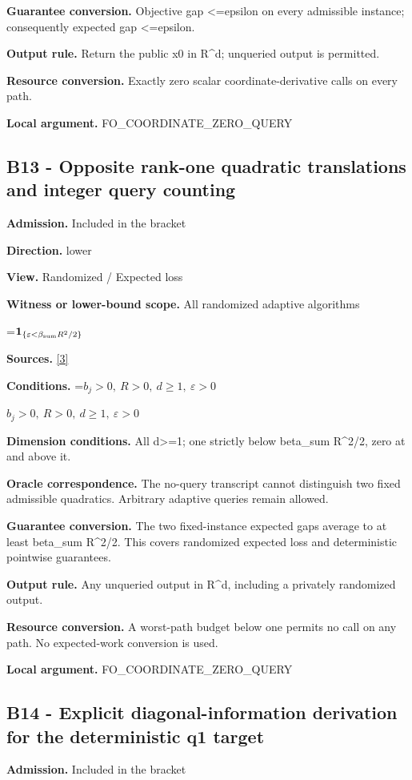 \documentclass[10pt,a4paper]{article}
\newcommand{\AtlasMath}[1]{\par\begingroup\centering\setbox0=\hbox{$\displaystyle #1$}\ifdim\wd0>1.4\linewidth\typeout{ATLAS WIDE FORMULA: \the\wd0}\fi\ifdim\wd0>\linewidth\resizebox{\linewidth}{!}{\box0}\else\box0\fi\par\endgroup}
\newcommand{\AtlasInlineMath}[1]{\begingroup\setbox0=\hbox{$#1$}\ifdim\wd0>.4\linewidth\endgroup\AtlasMath{#1}\else\endgroup$#1$\fi}
\begin{document}
\textbf{Guarantee conversion.} Objective gap <=epsilon on every admissible instance; consequently expected gap <=epsilon.

\textbf{Output rule.} Return the public x0 in R\textasciicircum{}d; unqueried output is permitted.

\textbf{Resource conversion.} Exactly zero scalar coordinate-derivative calls on every path.

\textbf{Local argument.} FO\_\allowbreak{}COORDINATE\_\allowbreak{}ZERO\_\allowbreak{}QUERY

\subsection{B13 - Opposite rank-one quadratic translations and integer query counting}
\textbf{Admission.} Included in the bracket

\textbf{Direction.} lower

\textbf{View.} Randomized / Expected loss

\textbf{Witness or lower-bound scope.} All randomized adaptive algorithms

\AtlasMath{\mathbf{1}_{\{\varepsilon<\beta_{\rm sum}R^2/2\}}}
\textbf{Sources.} \href{https://arxiv.org/pdf/1405.4980}{[3]}

\textbf{Conditions.} \AtlasInlineMath{b_j>0,\ R>0,\ d\ge1,\ \varepsilon>0}

\textbf{Dimension conditions.} All d>=1; one strictly below beta\_\allowbreak{}sum R\textasciicircum{}2/2, zero at and above it.

\textbf{Oracle correspondence.} The no-query transcript cannot distinguish two fixed admissible quadratics. Arbitrary adaptive queries remain allowed.

\textbf{Guarantee conversion.} The two fixed-instance expected gaps average to at least beta\_\allowbreak{}sum R\textasciicircum{}2/2. This covers randomized expected loss and deterministic pointwise guarantees.

\textbf{Output rule.} Any unqueried output in R\textasciicircum{}d, including a privately randomized output.

\textbf{Resource conversion.} A worst-path budget below one permits no call on any path. No expected-work conversion is used.

\textbf{Local argument.} FO\_\allowbreak{}COORDINATE\_\allowbreak{}ZERO\_\allowbreak{}QUERY

\subsection{B14 - Explicit diagonal-information derivation for the deterministic q1 target}
\textbf{Admission.} Included in the bracket
\end{document}
